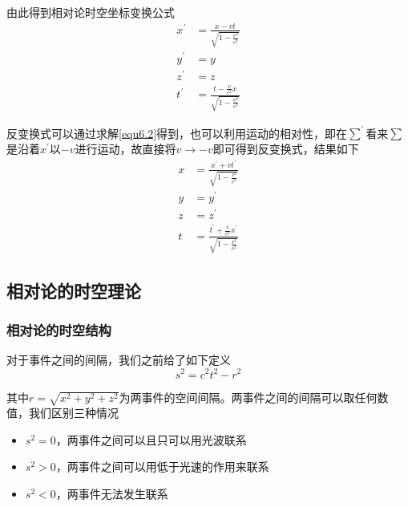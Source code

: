 \documentclass[UTF8]{ctexart}
\begin{document}
\noindent 由此得到相对论时空坐标变换公式
\begin{equation}
    \begin{aligned}
    x^{\prime}&=\frac{x-v t}{\sqrt{1-\frac{v^{2}}{c^{2}}}} \\ y^{\prime}&=y \\ z^{\prime}&=z \\ t^{\prime}&=\frac{t-\frac{v}{c^{2}} x}{\sqrt{1-\frac{v^{2}}{c^{2}}}}\label{equ6.2}
    \end{aligned}
\end{equation}

    反变换式可以通过求解\autoref{equ6.2}得到，也可以利用运动的相对性，即在$\sum^{\prime}$看来$\sum$是沿着$x^{\prime}$以$-v$进行运动，故直接将$v \to -v$即可得到反变换式，结果如下
    \begin{equation}
    \begin{aligned} x &=\frac{x^{\prime}+v t^{\prime}}{\sqrt{1-\frac{v^{2}}{c^{2}}}} \\ y &=y^{\prime} \\ z &=z^{\prime} \\ t &=\frac{t^{\prime}+\frac{v}{c^{2}} x^{\prime}}{\sqrt{1-\frac{v^{2}}{c^{2}}}} \end{aligned} \label{equ6.3}
    \end{equation}

    \subsection{相对论的时空理论}
    \subsubsection{相对论的时空结构}
    对于事件之间的间隔，我们之前给了如下定义
    \begin{equation}
        s^2 = c^2t^2-r^2
    \end{equation}

\noindent 其中$r=\sqrt{x^2 + y^2 +z^2}$为两事件的空间间隔。两事件之间的间隔可以取任何数值，我们区别三种情况
\begin{itemize}
    \item $s^2 = 0$，两事件之间可以且只可以用光波联系
    \item $s^2>0$，两事件之间可以用低于光速的作用来联系
    \item $s^2<0$，两事件无法发生联系
\end{itemize}
\end{document}

